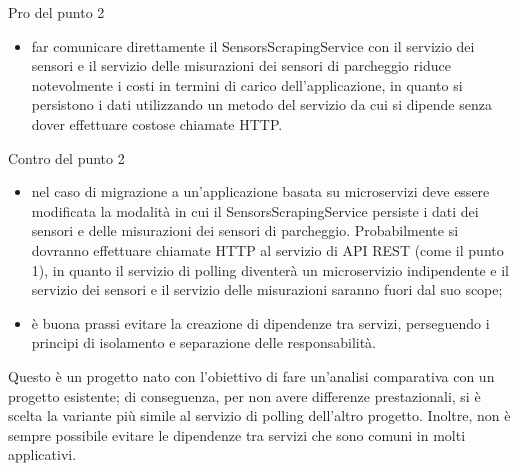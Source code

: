 \leavevmode\newline
Pro del punto 2
\begin{itemize}
    \item far comunicare direttamente il SensorsScrapingService con il servizio dei sensori e il servizio delle misurazioni dei sensori di parcheggio
        riduce notevolmente i costi in termini di carico dell'applicazione, in quanto si persistono i dati utilizzando un
        metodo del servizio da cui si dipende senza dover effettuare costose chiamate \gls{HTTP}. 
\end{itemize}
\leavevmode\newline
Contro del punto 2
\begin{itemize}
    \item nel caso di migrazione a un'applicazione basata su microservizi deve essere modificata la modalità in cui il SensorsScrapingService 
        persiste i dati dei sensori
        e delle misurazioni dei sensori di parcheggio. Probabilmente si dovranno effettuare chiamate \gls{HTTP} al servizio di \gls{API} \gls{REST} (come il punto 1),
        in quanto il servizio di polling diventerà un microservizio indipendente e il servizio dei 
        sensori e il servizio delle misurazioni saranno fuori dal suo scope;
    \item è buona prassi evitare la creazione di dipendenze tra servizi, perseguendo i
        principi di isolamento e separazione delle responsabilità.
\end{itemize}
\leavevmode\newline
Questo è un progetto nato con l'obiettivo di fare un'analisi comparativa con un progetto esistente;
di conseguenza, per non avere differenze prestazionali, si è scelta la variante più simile al 
servizio di polling dell'altro progetto. Inoltre, non è sempre possibile evitare le dipendenze tra servizi
che sono comuni in molti applicativi.

